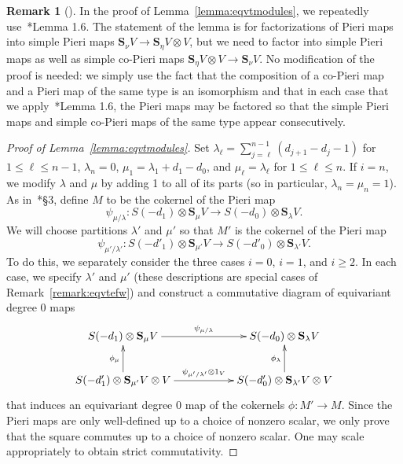 \documentclass[12pt]{amsart}
\theoremstyle{definition}
\newtheorem{rmk}[equation]{Remark}
\newenvironment{remark}[1][]{\begin{rmk}[#1] \pushQED{\qed}}{\popQED \end{rmk}}
\newcommand{\Sc}{\mathbf{S}}
\begin{document}
\begin{remark} In the proof of Lemma~\ref{lemma:eqvtmodules}, we
  repeatedly use~\cite{sam}*{Lemma 1.6}. The statement of the lemma is
  for factorizations of Pieri maps into simple Pieri maps $\Sc_\nu V
  \to \Sc_\eta V \otimes V$, but we need to factor into simple Pieri
  maps as well as simple co-Pieri maps $\Sc_\eta V \otimes V \to
  \Sc_\nu V$. No modification of the proof is needed: we simply use
  the fact that the composition of a co-Pieri map and a Pieri map of
  the same type is an isomorphism and that in each case that we
  apply~\cite{sam}*{Lemma 1.6}, the Pieri maps may be factored so that
  the simple Pieri maps and simple co-Pieri maps of the same type
  appear consecutively.
\end{remark}

\begin{proof}[Proof of Lemma~\ref{lemma:eqvtmodules}] 
  Set $\lambda_\ell = \sum_{j=\ell}^{n-1} (d_{j+1} - d_j - 1)$ for $1
  \le \ell \le n-1$, $\lambda_n = 0$, $\mu_1 = \lambda_1 + d_1 - d_0$,
  and $\mu_\ell = \lambda_\ell$ for $1 \le \ell \le n$. If $i = n$, we
  modify $\lambda$ and $\mu$ by adding 1 to all of its parts (so in
  particular, $\lambda_n = \mu_n = 1$).  As in~\cite{efw}*{\S3},
  define $M$ to be the cokernel of the Pieri map
  \[
  \psi_{\mu / \lambda} \colon  S(-d_1) \otimes \Sc_\mu V \to S(-d_0)
  \otimes \Sc_\lambda V. 
  \]
  We will choose partitions $\lambda'$ and $\mu'$ so that
  $M'$ is the cokernel of the Pieri map
  \[
  \psi_{\mu' / \lambda'} \colon  S(-d'_1) \otimes \Sc_{\mu'} V \to
  S(-d'_0) \otimes \Sc_{\lambda'} V.
  \]
  To do this, we separately consider the three cases $i=0$, $i=1$, and $i \ge
  2$. In each case, we specify $\lambda'$ and $\mu'$ (these
  descriptions are special cases of Remark~\ref{remark:eqvtefw}) and
  construct a commutative diagram of equivariant degree 0 maps
  \begin{equation} \label{eqn:square} \xymatrix{ S(-d_1) \otimes
      \Sc_\mu V \ar[rr]^-{\psi_{\mu/\lambda}}
      & & S(-d_0) \otimes \Sc_\lambda V \\
      S(-d'_1) \otimes \Sc_{\mu'} V \otimes V \ar[rr]^-{ \psi_{\mu' /
          \lambda'} \otimes 1_V} \ar[u]^-{\phi_\mu} & & S(-d'_0)
      \otimes \Sc_{\lambda'} V \otimes V \ar[u]^-{\phi_\lambda} }
  \end{equation}
  that induces an equivariant degree 0 map of the cokernels $\phi
  \colon  M' \to M$. Since the Pieri maps are only
  well-defined up to a choice of nonzero scalar, we only prove
  that the square commutes up to a choice of nonzero scalar. 
  One may scale appropriately to obtain strict commutativity. 
%  
  

\end{proof}
\end{document}
